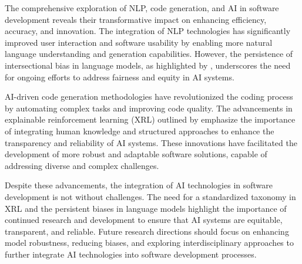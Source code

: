 The comprehensive exploration of NLP, code generation, and AI in software development reveals their transformative impact on enhancing efficiency, accuracy, and innovation. The integration of NLP technologies has significantly improved user interaction and software usability by enabling more natural language understanding and generation capabilities. However, the persistence of intersectional bias in language models, as highlighted by \cite{magee2021intersectionalbiascausallanguage}, underscores the need for ongoing efforts to address fairness and equity in AI systems.



AI-driven code generation methodologies have revolutionized the coding process by automating complex tasks and improving code quality. The advancements in explainable reinforcement learning (XRL) outlined by \cite{qing2023surveyexplainablereinforcementlearning} emphasize the importance of integrating human knowledge and structured approaches to enhance the transparency and reliability of AI systems. These innovations have facilitated the development of more robust and adaptable software solutions, capable of addressing diverse and complex challenges.



Despite these advancements, the integration of AI technologies in software development is not without challenges. The need for a standardized taxonomy in XRL and the persistent biases in language models highlight the importance of continued research and development to ensure that AI systems are equitable, transparent, and reliable. Future research directions should focus on enhancing model robustness, reducing biases, and exploring interdisciplinary approaches to further integrate AI technologies into software development processes.
